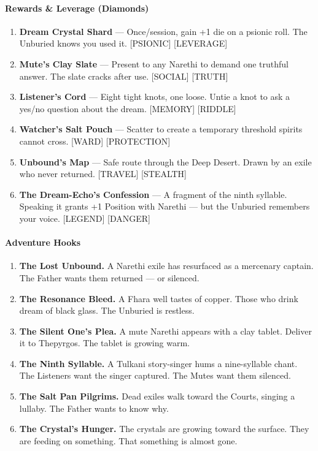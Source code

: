 \paragraph{Rewards \& Leverage (Diamonds)}
\begin{enumerate}
    \item \textbf{Dream Crystal Shard} --- Once/session, gain +1 die on a psionic roll. The Unburied knows you used it. [PSIONIC] [LEVERAGE]
    \item \textbf{Mute's Clay Slate} --- Present to any Narethi to demand one truthful answer. The slate cracks after use. [SOCIAL] [TRUTH]
    \item \textbf{Listener's Cord} --- Eight tight knots, one loose. Untie a knot to ask a yes/no question about the dream. [MEMORY] [RIDDLE]
    \item \textbf{Watcher's Salt Pouch} --- Scatter to create a temporary threshold spirits cannot cross. [WARD] [PROTECTION]
    \item \textbf{Unbound's Map} --- Safe route through the Deep Desert. Drawn by an exile who never returned. [TRAVEL] [STEALTH]
    \item \textbf{The Dream-Echo's Confession} --- A fragment of the ninth syllable. Speaking it grants +1 Position with Narethi --- but the Unburied remembers your voice. [LEGEND] [DANGER]
\end{enumerate}

\paragraph{Adventure Hooks}
\begin{enumerate}
    \item \textbf{The Lost Unbound.} A Narethi exile has resurfaced as a mercenary captain. The Father wants them returned --- or silenced.
    \item \textbf{The Resonance Bleed.} A Fhara well tastes of copper. Those who drink dream of black glass. The Unburied is restless.
    \item \textbf{The Silent One's Plea.} A mute Narethi appears with a clay tablet. Deliver it to Thepyrgos. The tablet is growing warm.
    \item \textbf{The Ninth Syllable.} A Tulkani story-singer hums a nine-syllable chant. The Listeners want the singer captured. The Mutes want them silenced.
    \item \textbf{The Salt Pan Pilgrims.} Dead exiles walk toward the Courts, singing a lullaby. The Father wants to know why.
    \item \textbf{The Crystal's Hunger.} The crystals are growing toward the surface. They are feeding on something. That something is almost gone.
\end{enumerate}

